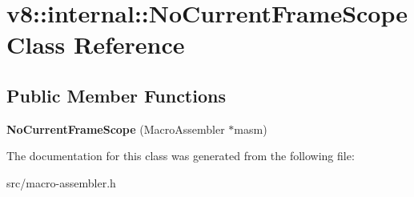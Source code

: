 \hypertarget{classv8_1_1internal_1_1_no_current_frame_scope}{}\section{v8\+:\+:internal\+:\+:No\+Current\+Frame\+Scope Class Reference}
\label{classv8_1_1internal_1_1_no_current_frame_scope}
\subsection*{Public Member Functions}
\begin{DoxyCompactItemize}
\item 
\hypertarget{classv8_1_1internal_1_1_no_current_frame_scope_ab7307b6340dc7e49193c60a82aef3a5e}{}{\bfseries No\+Current\+Frame\+Scope} (Macro\+Assembler $\ast$masm)\label{classv8_1_1internal_1_1_no_current_frame_scope_ab7307b6340dc7e49193c60a82aef3a5e}

\end{DoxyCompactItemize}


The documentation for this class was generated from the following file\+:\begin{DoxyCompactItemize}
\item 
src/macro-\/assembler.\+h\end{DoxyCompactItemize}
